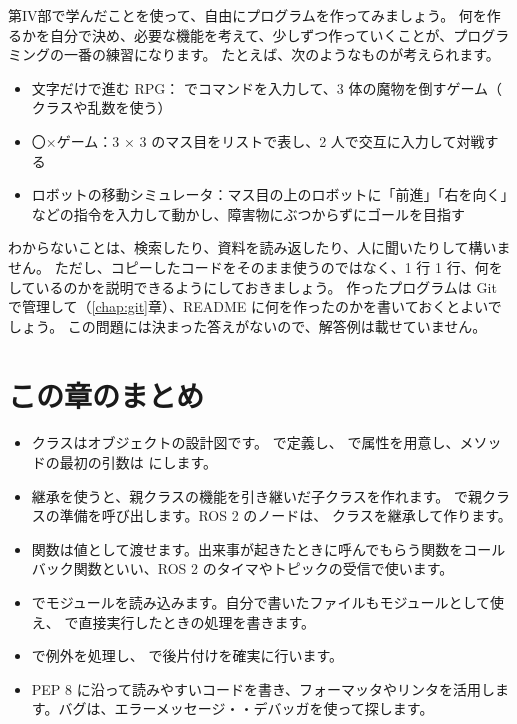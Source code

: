 \begin{exercise}[title={練習問題 \thetcbcounter（最終課題：自由製作）}]
  第IV部で学んだことを使って、自由にプログラムを作ってみましょう。
  何を作るかを自分で決め、必要な機能を考えて、少しずつ作っていくことが、プログラミングの一番の練習になります。
  たとえば、次のようなものが考えられます。
  \begin{itemize}
    \item 文字だけで進む RPG： でコマンドを入力して、3 体の魔物を倒すゲーム（ クラスや乱数を使う）
    \item 〇×ゲーム：3 × 3 のマス目をリストで表し、2 人で交互に入力して対戦する
    \item ロボットの移動シミュレータ：マス目の上のロボットに「前進」「右を向く」などの指令を入力して動かし、障害物にぶつからずにゴールを目指す
  \end{itemize}
  わからないことは、検索したり、資料を読み返したり、人に聞いたりして構いません。
  ただし、コピーしたコードをそのまま使うのではなく、1 行 1 行、何をしているのかを説明できるようにしておきましょう。
  作ったプログラムは Git で管理して（\ref{chap:git}章）、README に何を作ったのかを書いておくとよいでしょう。
  この問題には決まった答えがないので、解答例は載せていません。
\end{exercise}

\section*{この章のまとめ}

\begin{itemize}
  \item クラスはオブジェクトの設計図です。 で定義し、 で属性を用意し、メソッドの最初の引数は  にします。
  \item 継承を使うと、親クラスの機能を引き継いだ子クラスを作れます。 で親クラスの準備を呼び出します。ROS 2 のノードは、 クラスを継承して作ります。
  \item 関数は値として渡せます。出来事が起きたときに呼んでもらう関数をコールバック関数といい、ROS 2 のタイマやトピックの受信で使います。
  \item {} でモジュールを読み込みます。自分で書いたファイルもモジュールとして使え、 で直接実行したときの処理を書きます。
  \item {} で例外を処理し、 で後片付けを確実に行います。
  \item PEP 8 に沿って読みやすいコードを書き、フォーマッタやリンタを活用します。バグは、エラーメッセージ・・デバッガを使って探します。
\end{itemize}
